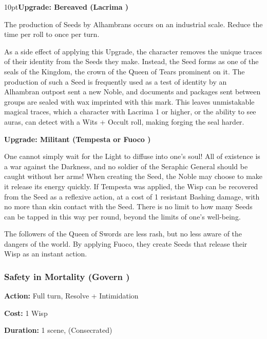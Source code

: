 \begin{myindentpar}{10pt}\textbf{Upgrade: Bereaved (Lacrima \textbullet\textbullet\textbullet)}

The production of Seeds by Alhambrans occurs on an industrial scale. Reduce the time per roll to once per turn. 

As a side effect of applying this Upgrade, the character removes the unique traces of their identity from the Seeds they make. Instead, the Seed forms as one of the seals of the Kingdom, the crown of the Queen of Tears prominent on it. The production of such a Seed is frequently used as a test of identity by an Alhambran outpost sent a new Noble, and documents and packages sent between groups are sealed with wax imprinted with this mark. This leaves unmistakable magical traces, which a character with Lacrima 1 or higher, or the ability to see auras, can detect with a Wits + Occult roll, making forging the seal harder.

\textbf{Upgrade: Militant (Tempesta \textbullet\textbullet or Fuoco \textbullet\textbullet\textbullet)}

One cannot simply wait for the Light to diffuse into one's soul! All of existence is a war against the Darkness, and no soldier of the Seraphic General should be caught without her arms! When creating the Seed, the Noble may choose to make it release its energy quickly. If Tempesta was applied, the Wisp can be recovered from the Seed as a reflexive action, at a cost of 1 resistant Bashing  damage, with no more than skin contact with the Seed. There is no limit to how many Seeds can be tapped in this way per round, beyond the limits of one's well-being.

The followers of the Queen of Swords are less rash, but no less aware of the dangers of the world. By applying Fuoco, they create Seeds that release their Wisp as an instant action.\end{myindentpar}

\subsubsection*{Safety in Mortality (Govern \textbullet\textbullet)}

\noindent \textbf{Action:} Full turn, Resolve + Intimidation

\noindent \textbf{Cost:} 1 Wisp

\noindent \textbf{Duration:} 1 scene, (Consecrated) \\

